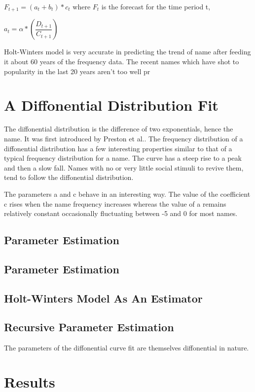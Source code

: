 \documentclass[letterpaper,10pt]{article}
\begin{document}
$F_{t+1} =( a_{t} + b_{t} ) * c_{t}$ where $F_{t}$ is the forecast for the time period t, 

$a_{t} = \alpha * (\dfrac {D_{t+1}} {C_{t+1}}) $

Holt-Winters model is very accurate in predicting the trend of name after feeding it about 60 years of the frequency data. The recent names which have shot to popularity in the last 20 years aren't too well pr

\section{A Diffonential Distribution Fit}
The diffonential distribution is the difference of two exponentials, hence the name. It was first introduced by Preston et al.\cite{1948 preston}. The frequency distribution of a diffonential distribution has a few interesting properties similar to that of a typical frequency distribution for a name.  The curve has a steep rise to a peak and then a slow fall. Names with no or very little social stimuli to revive them, tend to follow the diffonential distribution. 


The parameters a and c behave in an interesting way. The value of the coefficient c rises when the name frequency increases whereas the value of a remains relatively constant occasionally fluctuating between -5 and 0 for most names. 
\subsection{Parameter Estimation}
\subsection{Parameter Estimation}


\subsection{Holt-Winters Model As An Estimator}

\subsection{Recursive Parameter Estimation}
The parameters of the diffonential curve fit are themselves diffonential in nature. 


\section{Results}
\end{document}
